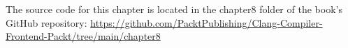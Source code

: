 The source code for this chapter is located in the chapter8 folder of the book's GitHub repository: \url{https://github.com/PacktPublishing/Clang-Compiler-Frontend-Packt/tree/main/chapter8}
